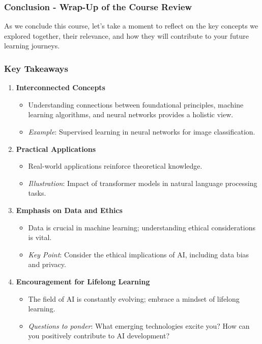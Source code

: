 \documentclass[aspectratio=169]{beamer}
\begin{document}
\begin{frame}[fragile]
    \frametitle{Conclusion - Wrap-Up of the Course Review}
    
    As we conclude this course, let's take a moment to reflect on the key concepts we explored together, their relevance, and how they will contribute to your future learning journeys.
\end{frame}

\begin{frame}[fragile]
    \frametitle{Key Takeaways}
    
    \begin{enumerate}
        \item \textbf{Interconnected Concepts}
        \begin{itemize}
            \item Understanding connections between foundational principles, machine learning algorithms, and neural networks provides a holistic view.
            \item \textit{Example}: Supervised learning in neural networks for image classification.
        \end{itemize}
        
        \item \textbf{Practical Applications}
        \begin{itemize}
            \item Real-world applications reinforce theoretical knowledge.
            \item \textit{Illustration}: Impact of transformer models in natural language processing tasks.
        \end{itemize}
        
        \item \textbf{Emphasis on Data and Ethics}
        \begin{itemize}
            \item Data is crucial in machine learning; understanding ethical considerations is vital.
            \item \textit{Key Point}: Consider the ethical implications of AI, including data bias and privacy.
        \end{itemize}
        
        \item \textbf{Encouragement for Lifelong Learning}
        \begin{itemize}
            \item The field of AI is constantly evolving; embrace a mindset of lifelong learning.
            \item \textit{Questions to ponder}: What emerging technologies excite you? How can you positively contribute to AI development?
        \end{itemize}
    \end{enumerate}
\end{frame}
\end{document}

